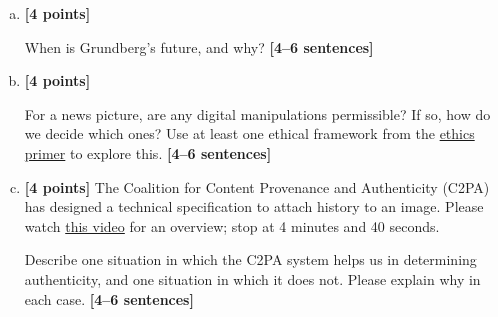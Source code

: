 \documentclass[11pt]{article}
\begin{document}
\begin{enumerate}[(a)]
\item \textbf{[4 points]}
    \begin{tcolorbox}[colback=orange!5!white,colframe=orange!75!black]
        When is Grundberg's future, and why? \textbf{[4--6 sentences]}
    \end{tcolorbox}

\item \textbf{[4 points]}
    \begin{tcolorbox}[colback=orange!5!white,colframe=orange!75!black]
        For a news picture, are any digital manipulations permissible? If so, how do we decide which ones? Use at least one ethical framework from the \href{https://browncsci1430.github.io/resources/ethics_primer/}{ethics primer} to explore this. \textbf{[4--6 sentences]}
    \end{tcolorbox}
    
\pagebreak
\item \textbf{[4 points]}
    The Coalition for Content Provenance and Authenticity (C2PA) has designed a technical specification to attach history to an image. Please watch \href{https://www.youtube.com/watch?v=hA0ZjqakEF8}{this video} for an overview; stop at 4 minutes and 40 seconds.
    \begin{tcolorbox}[colback=orange!5!white,colframe=orange!75!black]
        Describe one situation in which the C2PA system helps us in determining authenticity, and one situation in which it does not. Please explain why in each case. \textbf{[4--6 sentences]}
    \end{tcolorbox}
\end{enumerate}
\end{document}
